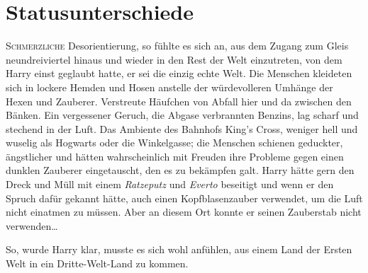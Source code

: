 \chapter{Statusunterschiede}

\lettrine{S}{chmerzliche} Desorientierung, so fühlte es sich an, aus dem Zugang zum Gleis neundreiviertel hinaus und wieder in den Rest der Welt einzutreten, von dem Harry einst geglaubt hatte, er sei die einzig echte Welt. Die Menschen kleideten sich in lockere Hemden und Hosen anstelle der würdevolleren Umhänge der Hexen und Zauberer. Verstreute Häufchen von Abfall hier und da zwischen den Bänken. Ein vergessener Geruch, die Abgase verbrannten Benzins, lag scharf und stechend in der Luft. Das Ambiente des Bahnhofs King's Cross, weniger hell und wuselig als Hogwarts oder die Winkelgasse; die Menschen schienen geduckter, ängstlicher und hätten wahrscheinlich mit Freuden ihre Probleme gegen einen dunklen Zauberer eingetauscht, den es zu bekämpfen galt. Harry hätte gern den Dreck und Müll mit einem \emph{Ratzeputz} und \emph{Everto} beseitigt und wenn er den Spruch dafür gekannt hätte, auch einen Kopfblasenzauber verwendet, um die Luft nicht einatmen zu müssen. Aber an diesem Ort konnte er seinen Zauberstab nicht verwenden…

So, wurde Harry klar, musste es sich wohl anfühlen, aus einem Land der Ersten Welt in ein Dritte-Welt-Land zu kommen.

